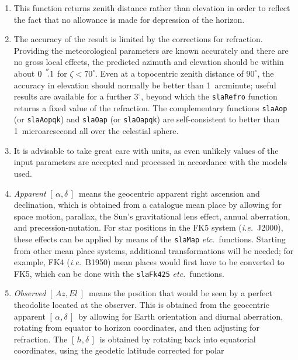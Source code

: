 \documentclass[11pt,fleqn,twoside]{article}
\renewcommand{\_}{{\tt\char'137}}     %
\newcommand{\radec}     {$[\,\alpha,\delta\,]$}
\newcommand{\hadec}     {$[\,h,\delta\,]$}
\newcommand{\azel}      {$[\,Az,El~]$}
\newcommand{\arcseci}[1] {$#1\hspace{0.05em}$\raisebox{-0.5ex}
                         {$^{'\hspace{-0.1em}'\hspace{0.0em}}$}}
\newcommand{\arcsec}[2] {\arcseci{#1}$\hspace{-0.35em}.#2$}
\begin{document}
{
 \begin{enumerate}
  \item This function returns zenith distance rather than elevation
        in order to reflect the fact that no allowance is made for
        depression of the horizon.
  \item The accuracy of the result is limited by the corrections for
        refraction.  Providing the meteorological parameters are
        known accurately and there are no gross local effects, the
        predicted azimuth and elevation should be within about
        \arcsec{0}{1} for $\zeta<70^{\circ}$.  Even
        at a topocentric zenith distance of
        $90^{\circ}$, the accuracy in elevation should
        normally be better than
        1~arcminute;  useful results are available for a further
        $3^{\circ}$, beyond which the {\tt slaRefro} function returns a
        fixed value of the refraction.  The complementary
        functions {\tt slaAop} (or {\tt slaAopqk})
        and {\tt slaOap} (or {\tt slaOapqk})
        are self-consistent to better than 1~microarcsecond all over
        the celestial sphere.
  \item It is advisable to take great care with units, as even
        unlikely values of the input parameters are accepted and
        processed in accordance with the models used.
  \item {\it Apparent}\/ \radec\ means the geocentric apparent
        right ascension
        and declination, which is obtained from a catalogue mean place
        by allowing for space motion, parallax, the Sun's gravitational
        lens effect, annual aberration, and precession-nutation.  For
        star positions in the FK5 system ({\it i.e.}~J2000), these
        effects can
        be applied by means of the {\tt slaMap} {\it etc.}\ functions.
        Starting from
        other mean place systems, additional transformations will be
        needed;  for example, FK4 ({\it i.e.}~B1950) mean places would
        first have to be converted to FK5, which can be done with the
        {\tt slaFk425} {\it etc.}\ functions.
  \item {\it Observed}\/ \azel\ means the position that would be seen by a
        perfect theodolite located at the observer.  This is obtained
        from the geocentric apparent \radec\ by allowing for Earth
        orientation and diurnal aberration, rotating from equator
        to horizon coordinates, and then adjusting for refraction.
        The \hadec\ is obtained by rotating back into equatorial
        coordinates, using the geodetic latitude corrected for polar

\end{enumerate}}
\end{document}
